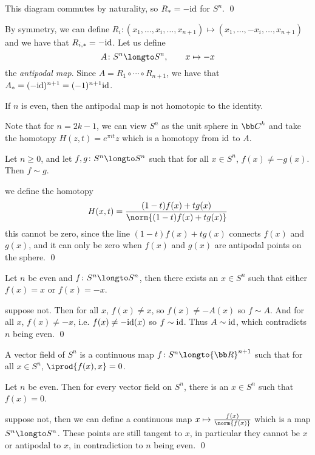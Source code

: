 This diagram commutes by naturality, so $R_*=-{\rm id}$ for $S^n$.
\qed

By symmetry, we can define $R_i\colon(x_1,\dots,x_i,\dots,x_{n+1})\mapsto(x_1,\dots,-x_i,\dots,x_{n+1})$ and we have that $R_{i,*}=-{\rm id}$.
Let us define
$$ A\colon S^n\longto S^n,\qquad x\mapsto -x $$
the {\it antipodal map}.
Since $A=R_1\circ\cdots\circ R_{n+1}$, we have that $A_*=(-{\rm id})^{n+1}=(-1)^{n+1}{\rm id}$.

\bcoro

    If $n$ is even, then the antipodal map is not homotopic to the identity.

\ecoro

Note that for $n=2k-1$, we can view $S^n$ as the unit sphere in ${\bb C}^k$ and take the homotopy $H(z,t)=e^{\pi it}z$ which is a homotopy from ${\rm id}$ to $A$.

\blemm

    Let $n\geq0$, and let $f,g\colon S^n\longto S^n$ such that for all $x\in S^n$, $f(x)\neq-g(x)$.
    Then $f\sim g$.

\elemm

\Proof we define the homotopy
$$ H(x,t) = \frac{(1-t)f(x)+tg(x)}{\norm{(1-t)f(x)+tg(x)}} $$
this cannot be zero, since the line $(1-t)f(x)+tg(x)$ connects $f(x)$ and $g(x)$, and it can only be zero when $f(x)$ and $g(x)$ are antipodal points on the sphere.
\qed

\bthrm

    Let $n$ be even and $f\colon S^n\longto S^n$, then there exists an $x\in S^n$ such that either $f(x)=x$ or $f(x)=-x$.

\ethrm

\Proof suppose not.
Then for all $x$, $f(x)\neq x$, so $f(x)\neq -A(x)$ so $f\sim A$.
And for all $x$, $f(x)\neq -x$, i.e. $f(x)\neq -{\rm id}(x)$ so $f\sim{\rm id}$.
Thus $A\sim{\rm id}$, which contradicts $n$ being even.
\qed

\bdefn

    A {\emphcolor vector field} of $S^n$ is a continuous map $f\colon S^n\longto{\bb R}^{n+1}$ such that for all $x\in S^n$, $\iprod{f(x),x}=0$.

\edefn

\bthrm[title=Hairy Ball Theorem]

    Let $n$ be even.
    Then for every vector field on $S^n$, there is an $x\in S^n$ such that $f(x)=0$.

\ethrm

\Proof suppose not, then we can define a continuous map $x\mapsto\frac{f(x)}{\norm{f(x)}}$ which is a map $S^n\longto S^n$.
These points are still tangent to $x$, in particular they cannot be $x$ or antipodal to $x$, in contradiction to $n$ being even.
\qed

